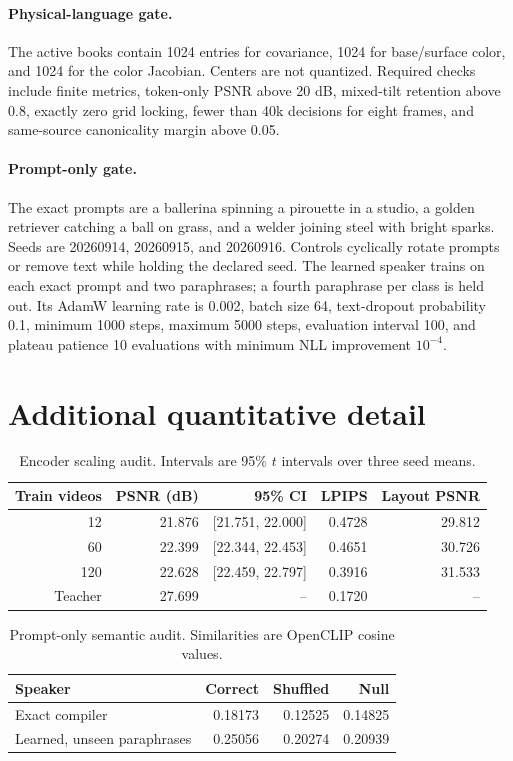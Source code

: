 \documentclass{article}
\begin{document}
\paragraph{Physical-language gate.}
The active books contain 1024 entries for covariance, 1024 for base/surface color, and 1024 for the
color Jacobian. Centers are not quantized. Required checks include finite metrics, token-only PSNR
above 20 dB, mixed-tilt retention above 0.8, exactly zero grid locking, fewer than 40k decisions for
eight frames, and same-source canonicality margin above 0.05.

\paragraph{Prompt-only gate.}
The exact prompts are a ballerina spinning a pirouette in a studio, a golden retriever catching a
ball on grass, and a welder joining steel with bright sparks. Seeds are 20260914, 20260915, and
20260916. Controls cyclically rotate prompts or remove text while holding the declared seed. The
learned speaker trains on each exact prompt and two paraphrases; a fourth paraphrase per class is
held out. Its AdamW learning rate is 0.002, batch size 64, text-dropout probability 0.1, minimum
1000 steps, maximum 5000 steps, evaluation interval 100, and plateau patience 10 evaluations with
minimum NLL improvement $10^{-4}$.

\section{Additional quantitative detail}

\begin{table}[ht]
\centering
\caption{Encoder scaling audit. Intervals are 95\% $t$ intervals over three seed means.}
\small
\begin{tabular}{@{}rrrrr@{}}
\toprule
Train videos & PSNR (dB) & 95\% CI & LPIPS & Layout PSNR \\
\midrule
12  & 21.876 & [21.751, 22.000] & 0.4728 & 29.812 \\
60  & 22.399 & [22.344, 22.453] & 0.4651 & 30.726 \\
120 & 22.628 & [22.459, 22.797] & 0.3916 & 31.533 \\
Teacher & 27.699 & -- & 0.1720 & -- \\
\bottomrule
\end{tabular}
\end{table}

\begin{table}[ht]
\centering
\caption{Prompt-only semantic audit. Similarities are OpenCLIP cosine values.}
\small
\begin{tabular}{@{}lrrr@{}}
\toprule
Speaker & Correct & Shuffled & Null \\
\midrule
Exact compiler & 0.18173 & 0.12525 & 0.14825 \\
Learned, unseen paraphrases & 0.25056 & 0.20274 & 0.20939 \\
\bottomrule
\end{tabular}
\end{table}
\end{document}
